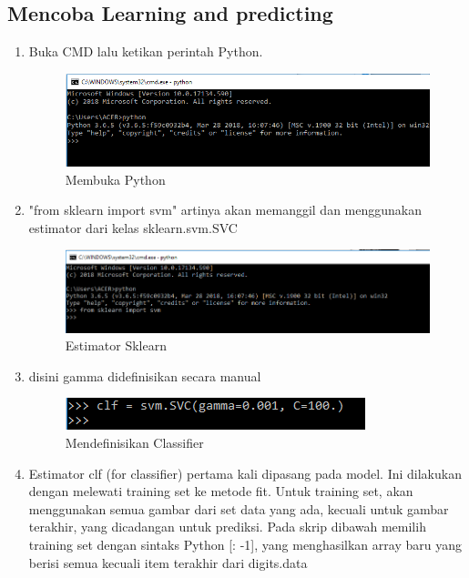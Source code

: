 \subsection{Mencoba Learning and predicting}

\begin{enumerate}
\item
Buka CMD lalu ketikan perintah Python.
\begin{figure}
	\begin{center}
   	 \includegraphics[scale=1]{figures/andri1.png}
   	 \caption{Membuka Python }	
	\end{center}
\end{figure}
\item
 "from sklearn import svm"  artinya akan memanggil dan menggunakan estimator dari kelas sklearn.svm.SVC
\begin{figure}
	\begin{center}
   	 \includegraphics[scale=1]{figures/andri2.png}
   	 \caption{ Estimator Sklearn }	
	\end{center}
\end{figure}
\item
 disini gamma didefinisikan secara manual
\begin{figure}
	\begin{center}
   	 \includegraphics[scale=1]{figures/andri3.png}
   	 \caption{Mendefinisikan Classifier }	
	\end{center}
\end{figure}
\item
Estimator clf (for classifier) pertama kali dipasang pada model. Ini dilakukan dengan melewati training set ke metode fit. Untuk training set, akan menggunakan semua gambar dari set data yang ada, kecuali untuk gambar terakhir, yang dicadangan untuk prediksi. Pada skrip dibawah memilih training set dengan sintaks Python [: -1], yang menghasilkan array baru yang berisi semua kecuali item terakhir dari digits.data

\end{enumerate}
